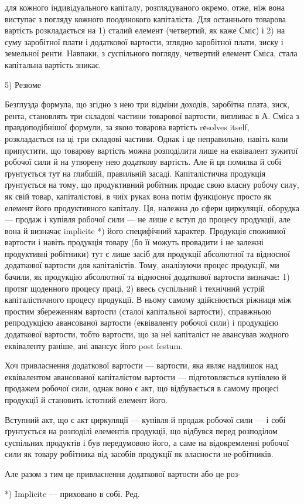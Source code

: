 для кожного індивідуального капіталу, розглядуваного окремо, отже, ніж
вона виступає з погляду кожного поодинокого капіталіста. Для останнього
товарова вартість розкладається на 1) сталий елемент (четвертий,
як каже Сміс) і 2) на суму заробітної плати і додаткової вартости, зглядно
заробітної плати, зиску і земельної ренти. Навпаки, з суспільного погляду,
четвертий елемент Сміса, стала капітальна вартість зникає.

5) Резюме

Безглузда формула, що згідно з нею три відміни доходів, заробітна
плата, зиск, рента, становлять три складові частини товарової вартости,
випливає в А. Сміса з правдоподібнішої формули, за якою товарова
вартість rеsolves itself, розкладається на ці три складові частини. Однак
і це неправильно, навіть коли припустити, що товарову вартість можна
розподілити лише на еквівалент зужитої робочої сили й на утворену
нею додаткову вартість. Але й ця помилка й собі ґрунтується тут на
глибшій, правильній засаді. Капіталістична продукція ґрунтується на тому,
що продуктивний робітник продає свою власну робочу силу, як свій
товар, капіталістові, в чиїх руках вона потім функціонує просто як елемент
його продуктивного капіталу. Ця, належна до сфери циркуляції,
оборудка — продаж і купівля робочої сили — не лише є вступ до процесу
продукції, але вона й визначає implicite *) його специфічний характер.
Продукція споживної вартости і навіть продукція товару (бо її можуть
провадити і не залежні продуктивні робітники) тут є лише засіб для продукції
абсолютної та відносної додаткової вартости для капіталістів. Тому, аналізуючи
процес продукції, ми бачили, як продукцію абсолютної та відносної
додаткової вартости визначає: 1) протяг щоденного процесу праці,
2) ввесь суспільний і технічний устрій капіталістичного процесу продукції.
В ньому самому здійснюється ріжниця між простим збереженням вартости
(сталої капітальної вартости), справжньою репродукцією авансованої вартости
(еквіваленту робочої сили) і продукцією додаткової вартости, тобто
вартости, що за неї капіталіст не авансував жодного еквіваленту раніше,
ані авансує його post festum.

Хоч привласнення додаткової вартости — вартости, яка являє надлишок
над еквівалентом авансованої капіталістом вартости — підготовляється
купівлею й продажем робочої сили, однак воно є акт, що відбувається
в самому процесі продукції й становить істотний елемент його.

Вступний акт, що є акт циркуляції — купівля й продаж робочої сили — і
собі ґрунтується на розподілі елементів продукції, що відбувся перед
розподілом суспільних продуктів і був передумовою його, а саме на
відокремленні робочої сили як товару робітника від засобів продукції
як власности не-робітників.

Але разом з тим це привласнення додаткової вартости або це роз-

*) Implicite — приховано в собі. Ред.
